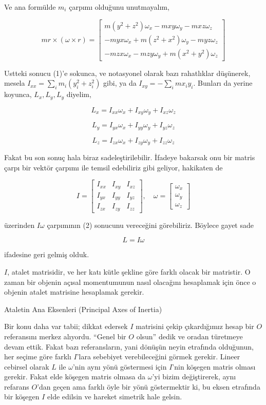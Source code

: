 \documentclass[12pt,fleqn]{article}\usepackage{../../common}
\begin{document}
Ve ana formülde $m_i$ çarpımı olduğunu unutmayalım,

$$
m r \times (\omega \times r) =
\left[\begin{array}{c}
m (y^2 + z^2) \omega_x - m xy \omega_y - m xz \omega_z \\
-m yx \omega_x + m (z^2 + x^2)\omega_y - m yz \omega_z \\    
-m zx \omega_x - m zy \omega_y + m (x^2+y^2)\omega_z
\end{array}\right]
$$

Ustteki sonucu (1)'e sokunca, ve notasyonel olarak bazı rahatlıklar düşünerek,
mesela $I_{xx} = \sum_i m_i (y_i^2 + z_i^2)$ gibi, ya da $I_{xy} = - \sum_i m x_i y_i$.
Bunları da yerine koyunca, $L_x,L_y,L_y$ diyelim,

$$
L_x = I_{xx} \omega_x + I_{xy} \omega_y + I_{xz} \omega_z
$$

$$
L_y = I_{yx} \omega_x + I_{yy} \omega_y + I_{yz} \omega_z
$$

$$
L_z = I_{zx} \omega_x + I_{zy} \omega_y + I_{zz} \omega_z
$$

Fakat bu son sonuç hala biraz sadeleştirilebilir. İfadeye bakarsak onu bir
matris çarpı bir vektör çarpımı ile temsil edebiliriz gibi geliyor,
hakikaten de

$$
I = \left[\begin{array}{ccc}
I_{xx} & I_{xy} & I_{xz} \\
I_{yx} & I_{yy} & I_{yz} \\
I_{zx} & I_{zy} & I_{zz} 
\end{array}\right], \quad
\omega = \left[\begin{array}{c}
\omega_x \\ \omega_y \\ \omega_z
\end{array}\right]
$$

üzerinden $I \omega$ çarpımının (2) sonucunu vereceğini görebiliriz. Böylece
gayet sade

$$
L = I \omega
$$

ifadesine geri gelmiş olduk.

$I$, atalet matrisidir, ve her katı kütle şekline göre farklı olacak bir
matristir. O zaman bir objenin açısal momentumunun nasıl olacağını hesaplamak
için önce o objenin atalet matrisine hesaplamak gerekir.

Ataletin Ana Eksenleri (Principal Axes of Inertia) 

Bir konu daha var tabii; dikkat edersek $I$ matrisini çekip çıkardığımız hesap
bir $O$ referansını merkez alıyordu. ``Genel bir $O$ olsun'' dedik ve oradan
türetmeye devam ettik. Fakat bazı referansların, yani dönüşün neyin etrafında
olduğunun, her seçime göre farklı $I$'lara sebebiyet verebileceğini görmek
gerekir. Lineer cebirsel olarak $L$ ile $\omega$'nin aynı yönü göstermesi için
$I$'nin köşegen matris olması gerekir. Fakat elde köşegen matris olmasa da
$\omega$'yi bizim değiştirerek, aynı refarans $O$'dan geçen ama farklı öyle bir
yönü göstermektir ki, bu eksen etrafında bir köşegen $I$ elde edilsin ve hareket
simetrik hale gelsin.
\end{document}
